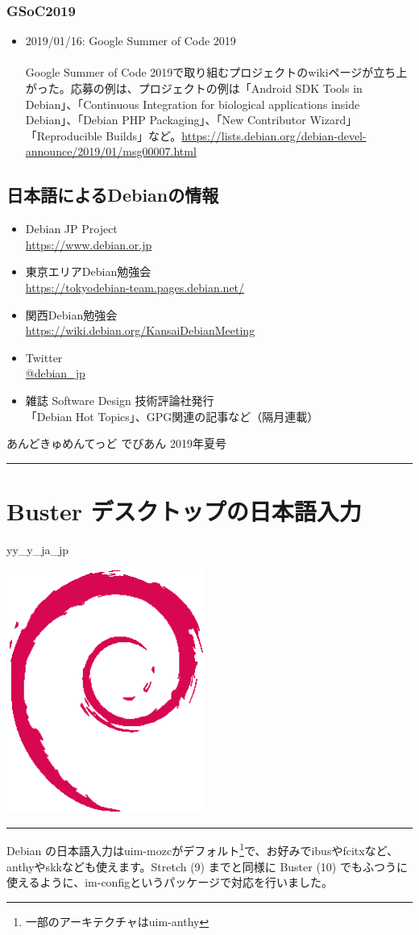 \documentclass[mingoth,a4paper]{jsarticle}
\renewcommand{\dancersection}[2]{%
\newpage
あんどきゅめんてっど でびあん 2019年夏号
%
\vspace{0.1mm}\\
{\color{dancerdarkblue}\rule{\hsize}{2mm}}

%
%
\begin{minipage}[t]{0.6\hsize}
\color{dancerdarkblue}
\vspace{1cm}
\section{#1}
\hfill{}#2\\
\end{minipage}
\begin{minipage}[t]{0.4\hsize}
\vspace{-2cm}
\hfill{}\includegraphics[height=8cm]{image200502/openlogo-nd.eps}\\
\vspace{-5cm}
\end{minipage}
%
{\color{dancerlightblue}\rule{0.66\hsize}{2mm}}
%
\vspace{2cm}
}
\begin{document}
\subsubsection{GSoC2019}


\begin{itemize}
\item 2019/01/16: Google Summer of Code 2019\\
\ \\
\small{Google Summer of Code 2019で取り組むプロジェクトのwikiページが立ち上がった。応募の例は、プロジェクトの例は「Android SDK Tools in Debian」、「Continuous Integration for biological applications inside Debian」、「Debian PHP Packaging」、「New Contributor Wizard」「Reproducible Builds」など。\url{https://lists.debian.org/debian-devel-announce/2019/01/msg00007.html}}

\end{itemize}





\subsection{日本語によるDebianの情報}


\begin{itemize}
  \item Debian JP Project \\
      \url{https://www.debian.or.jp}
  \item 東京エリアDebian勉強会\\
      \url{https://tokyodebian-team.pages.debian.net/}
  \item 関西Debian勉強会 \\
      \url{https://wiki.debian.org/KansaiDebianMeeting}
  \item Twitter \\
      \url{@debian_jp}
  \item  雑誌 Software Design 技術評論社発行 \\
    「Debian Hot Topics」、GPG関連の記事など（隔月連載）
\end{itemize}

\dancersection{Buster デスクトップの日本語入力}{yy\_y\_ja\_jp}

Debian の日本語入力はuim-mozcがデフォルト\footnote{一部のアーキテクチャはuim-anthy}で、お好みでibusやfcitxなど、anthyやskkなども使えます。Stretch (9) までと同様に Buster (10) でもふつうに使えるように、im-configというパッケージで対応を行いました。
\end{document}
